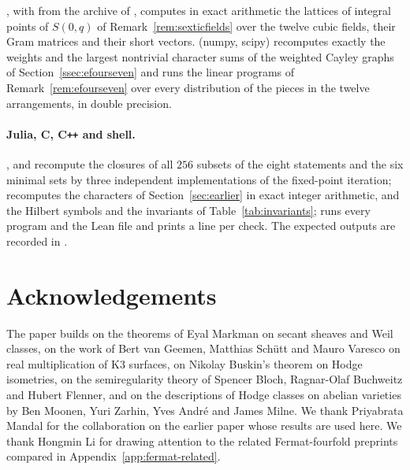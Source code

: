 \documentclass[11pt,reqno]{amsart}
\numberwithin{equation}{section}
\theoremstyle{plain}
\theoremstyle{definition}
\begin{document}
, with  from the archive of \cite{BMB26}, computes in exact arithmetic the lattices of integral points of $S(0,q)$ of Remark~\ref{rem:sexticfields} over the twelve cubic fields, their Gram matrices and their short vectors.  (numpy, scipy) recomputes exactly the weights and the largest nontrivial character sums of the weighted Cayley graphs of Section~\ref{ssec:efourseven} and runs the linear programs of Remark~\ref{rem:efourseven} over every distribution of the pieces in the twelve arrangements, in double precision.

\paragraph{Julia, C, C\texttt{++} and shell.} ,  and  recompute the closures of all $256$ subsets of the eight statements and the six minimal sets by three independent implementations of the fixed-point iteration;  recomputes the characters of Section~\ref{sec:earlier} in exact integer arithmetic, and  the Hilbert symbols and the invariants of Table~\ref{tab:invariants};  runs every program and the Lean file and prints a line per check. The expected outputs are recorded in .










\section*{Acknowledgements}
The paper builds on the theorems of Eyal Markman on secant sheaves and Weil classes, on the work of Bert van Geemen, Matthias Sch\"utt and Mauro Varesco on real multiplication of K3 surfaces, on Nikolay Buskin's theorem on Hodge isometries, on the semiregularity theory of Spencer Bloch, Ragnar-Olaf Buchweitz and Hubert Flenner, and on the descriptions of Hodge classes on abelian varieties by Ben Moonen, Yuri Zarhin, Yves Andr\'e and James Milne. We thank Priyabrata Mandal for the collaboration on the earlier paper \cite{BMB26} whose results are used here. We thank Hongmin Li for drawing attention to the related Fermat-fourfold
preprints compared in Appendix~\ref{app:fermat-related}.
\end{document}

